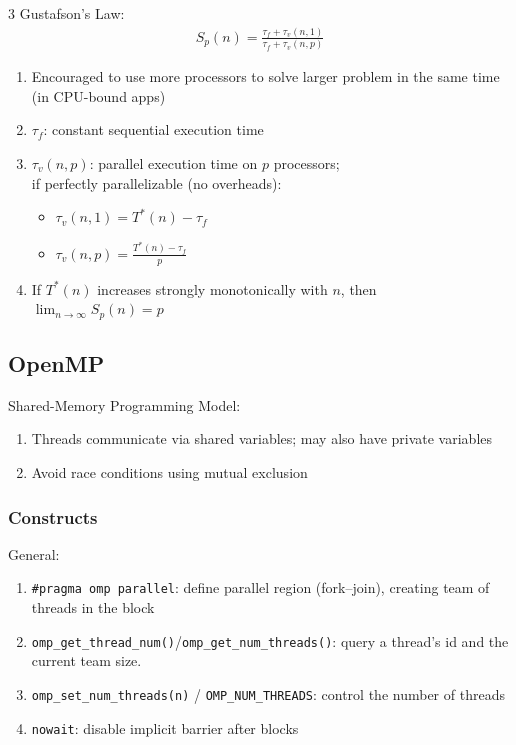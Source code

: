 \documentclass[12pt, a4paper]{article}
\begin{document}
\begin{multicols*}{3}
Gustafson's Law:
\begin{gather*}
  S_p(n) = \frac{\tau_f + \tau_v(n,1)}{\tau_f + \tau_v(n,p)}
\end{gather*}
\begin{enumerate}[\roman*.]
  \item Encouraged to use more processors to solve larger problem in the same time (in CPU-bound apps)
  \item $\tau_f$: constant sequential execution time 
  \item $\tau_v(n,p)$: parallel execution time on $p$ processors;\\if perfectly parallelizable (no overheads):
    \begin{itemize}[leftmargin=*]\vspace{3pt}
      \item $\tau_v(n,1)=T^*(n)-\tau_f$
      \item $\tau_v(n,p)=\frac{T^*(n)-\tau_f}{p}$
    \end{itemize}
  \item If $T^*(n)$ increases strongly monotonically with $n$, then $\lim_{n\rightarrow\infty} S_p(n)=p$
\end{enumerate}

\subsection{OpenMP}
Shared-Memory Programming Model:
\begin{enumerate}[\roman*.]
  \item Threads communicate via shared variables; may also have private variables
  \item Avoid race conditions using mutual exclusion
\end{enumerate} 

\subsubsection{Constructs}
General:
\begin{enumerate}[\roman*.]
  \item \lstinline|#pragma omp parallel|: define parallel region (fork--join), creating team of threads in the block
  \item \lstinline|omp_get_thread_num()|/\lstinline|omp_get_num_threads()|: query a thread's id and the current team size.
  \item \lstinline|omp_set_num_threads(n)| / \lstinline|OMP_NUM_THREADS|: control the number of threads 
  \item \lstinline|nowait|: disable implicit barrier after blocks
\end{enumerate}


\end{multicols*}
\end{document}
